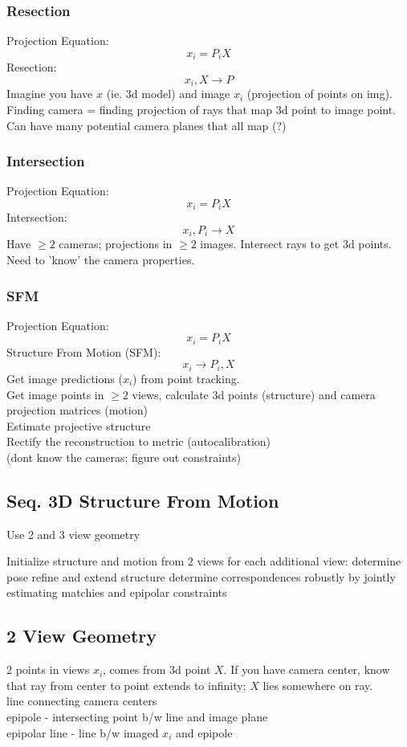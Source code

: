 \documentclass{article}
\begin{document}
\subsubsection{Resection}
Projection Equation:
\[
    x_i = P_i X
\]
Resection:
\[
    x_i, X\to P
\]
Imagine you have $x$ (ie. 3d model) and image $x_i$ (projection of points on img). 
Finding camera = finding projection of rays that map 3d point to image point.
\\
Can have many potential camera planes that all map (?)


\subsubsection{Intersection}
Projection Equation:
\[
    x_i = P_i X
\]
Intersection:
\[
    x_i, P_i \to X
\]
Have $\ge 2$ cameras; projections in $\ge 2$ images. Intersect rays to get 3d points. 
\\
Need to 'know' the camera properties. 

\subsubsection{SFM}
Projection Equation:
\[
    x_i = P_i X
\]
Structure From Motion (SFM):
\[
    x_i \to P_i, X
\]
Get image predictions ($x_i$) from point tracking.
\\
Get image points in $\ge 2$ views, calculate 3d points (structure) and 
camera projection matrices (motion)
\\
Estimate projective structure\\
Rectify the reconstruction to metric (autocalibration)
\\
(dont know the cameras; figure out constraints)

\subsection{Seq. 3D Structure From Motion}
Use 2 and 3 view geometry
\begin{outline}[enumerate]
    \1 Initialize structure and motion from 2 views
    \1 for each additional view:
        \2 determine pose
        \2 refine and extend structure
    \1 determine correspondences robustly by jointly estimating matchies and epipolar constraints
\end{outline}
\subsection{2 View Geometry}
2 points in views $x_i$, comes from 3d point $X$. If you have camera center, know that ray 
from center to point extends to infinity; $X$ lies somewhere on ray. 
\\
line connecting camera centers
\\
epipole - intersecting point b/w line and image plane
\\
epipolar line - line b/w imaged $x_i$ and epipole
\end{document}
